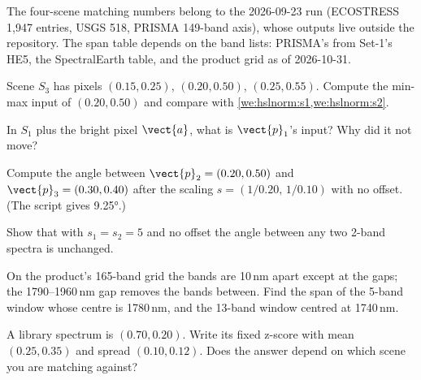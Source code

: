 \begin{drift}
The four-scene matching numbers belong to the 2026-09-23 run (ECOSTRESS 1,947 entries, USGS 518, PRISMA 149-band axis),
whose outputs live outside the repository. The span table depends on the band lists: PRISMA's from Set-1's HE5, the
SpectralEarth table, and the product grid as of 2026-10-31.
\end{drift}

\begin{confusions}
\end{confusions}

\begin{checkyourself}
\item\label{ex:hslnorm:1} Scene $S_3$ has pixels $(0.15,0.25)$, $(0.20,0.50)$, $(0.25,0.55)$. Compute the min-max input of
  $(0.20,0.50)$ and compare with \cref{we:hslnorm:s1,we:hslnorm:s2}.
\item\label{ex:hslnorm:2} In $S_1$ plus the bright pixel $\vect{a}$, what is $\vect{p}_1$'s input? Why did it not move?
\item\label{ex:hslnorm:3} Compute the angle between $\vect{p}_2=(0.20,0.50)$ and $\vect{p}_3=(0.30,0.40)$ after the scaling
  $s=(1/0.20,\,1/0.10)$ with no offset. (The script gives 9.25°.)
\item\label{ex:hslnorm:4} Show that with $s_1=s_2=5$ and no offset the angle between any two 2-band spectra is unchanged.
\item\label{ex:hslnorm:5} On the product's 165-band grid the bands are 10\,nm apart except at the gaps; the 1790--1960\,nm gap
  removes the bands between. Find the span of the 5-band window whose centre is 1780\,nm, and the 13-band window centred
  at 1740\,nm.
\item\label{ex:hslnorm:6} A library spectrum is $(0.70,0.20)$. Write its fixed z-score with mean $(0.25,0.35)$ and spread
  $(0.10,0.12)$. Does the answer depend on which scene you are matching against?
\end{checkyourself}

